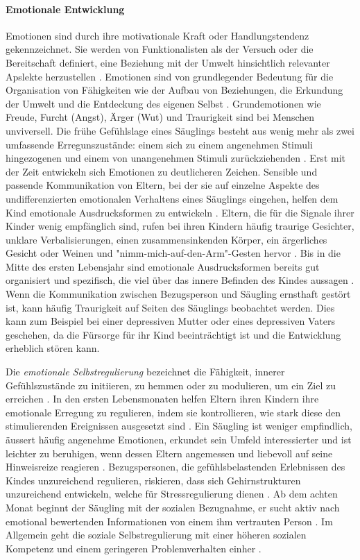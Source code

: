 \paragraph{Emotionale Entwicklung}\label{par:EmotionaleEntwicklung}
Emotionen sind durch ihre motivationale Kraft oder Handlungstendenz gekennzeichnet. Sie werden von Funktionalisten als der Versuch oder die Bereitschaft definiert, eine Beziehung mit der Umwelt hinsichtlich relevanter Apslekte herzustellen \cite[S.~529ff]{Siegler2008}. Emotionen sind von grundlegender Bedeutung für die Organisation von Fähigkeiten wie der Aufbau von Beziehungen, die Erkundung der Umwelt und die Entdeckung des eigenen Selbst \cite{Halle2003, Saarni2006}. Grundemotionen wie Freude, Furcht (Angst), Ärger (Wut) und Traurigkeit sind bei Menschen unviversell. Die frühe Gefühlslage eines Säuglings besteht aus wenig mehr als zwei umfassende Erregunszustände: einem sich zu einem angenehmen Stimuli hingezogenen und einem von unangenehmen Stimuli zurückziehenden \cite{Camras2003, Fox1991}. Erst mit der Zeit entwickeln sich Emotionen zu deutlicheren Zeichen. Sensible und passende Kommunikation von Eltern, bei der sie auf einzelne Aspekte des undifferenzierten emotionalen Verhaltens eines Säuglings eingehen, helfen dem Kind emotionale Ausdrucksformen zu entwickeln \cite{Gergely1999}. Eltern, die für die Signale ihrer Kinder wenig empfänglich sind, rufen bei ihren Kindern häufig traurige Gesichter, unklare Verbalisierungen, einen zusammensinkenden Körper, ein ärgerliches Gesicht oder Weinen und "nimm-mich-auf-den-Arm"-Gesten hervor \cite{Weinberg1994, Yale1999}. Bis in die Mitte des ersten Lebensjahr sind emotionale Ausdrucksformen bereits gut organisiert und spezifisch, die viel über das innere Befinden des Kindes aussagen \cite{Berk2011}. Wenn die Kommunikation zwischen Bezugsperson und Säugling ernsthaft gestört ist, kann häufig Traurigkeit auf Seiten des Säuglings beobachtet werden. Dies kann zum Beispiel bei einer depressiven Mutter oder eines depressiven Vaters geschehen, da die Fürsorge für ihr Kind beeinträchtigt ist und die Entwicklung erheblich stören kann.

Die \textit{emotionale Selbstregulierung} bezeichnet die Fähigkeit, innerer Gefühlszustände zu initiieren, zu hemmen oder zu modulieren, um ein Ziel zu erreichen \cite{Siegler2008}. In den ersten Lebensmonaten helfen Eltern ihren Kindern ihre emotionale Erregung zu regulieren, indem sie kontrollieren, wie stark diese den stimulierenden Ereignissen ausgesetzt sind \cite{Gianino1988}. Ein Säugling ist weniger empfindlich, äussert häufig angenehme Emotionen, erkundet sein Umfeld interessierter und ist leichter zu beruhigen, wenn dessen Eltern angemessen und liebevoll auf seine Hinweisreize reagieren \cite{Crockenberg2004}. Bezugspersonen, die gefühlsbelastenden Erlebnissen des Kindes unzureichend regulieren, riskieren, dass sich Gehirnstrukturen unzureichend entwickeln, welche für Stressregulierung dienen \cite[S.~250]{Berk2011}. Ab dem achten Monat beginnt der Säugling mit der sozialen Bezugnahme, er sucht aktiv nach emotional bewertenden Informationen von einem ihm vertrauten Person \cite{Mumme2007}. Im Allgemein geht die soziale Selbstregulierung mit einer höheren sozialen Kompetenz und einem geringeren Problemverhalten einher \cite[S.~580]{Siegler2008}. 

